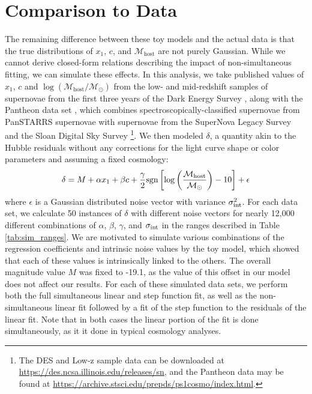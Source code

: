 \section{Comparison to Data}
\label{sec:data_comparison}
The remaining difference between these toy models and the actual data is that the true distributions of $x_1$, $c$, and $\mathcal{M}_\text{host}$ are not purely Gaussian. While we cannot derive closed-form relations describing the impact of non-simultaneous fitting, we can simulate these effects. In this analysis, we take published values of $x_1$, $c$ and $\log(\mathcal{M}_\text{host}/\mathcal{M}_\odot)$ from the low- and mid-redshift samples of supernovae from the first three years of the Dark Energy Survey \cite[][hereafter referred to as the Low-z and DES subsamples]{abbott_first_2019}, along with the Pantheon data set \citep{scolnic_complete_2018}, which combines spectroscopically-classified supernovae from PanSTARRS supernovae \cite[PS1;][]{rest_cosmological_2014, scolnic_color_2014} with supernovae from the SuperNova Legacy Survey \cite[SNLS;][]{conley_supernova_2011, sullivan_snls3_2011} and the Sloan Digital Sky Survey \cite[SDSS;][]{frieman_sloan_2008, kessler_first-year_2009, sako_data_2018}\footnote{The DES and Low-z sample data can be downloaded at \url{https://des.ncsa.illinois.edu/releases/sn}, and the Pantheon data may be found at \url{https://archive.stsci.edu/prepds/ps1cosmo/index.html}.}. We then modeled $\delta$, a quantity akin to the Hubble residuals without any corrections for the light curve shape or color parameters and assuming a fixed cosmology:
\begin{equation}
    \delta= M + \alpha x_1 + \beta c + \frac{\gamma}{2}\text{sgn}\left[\log\left(\frac{\mathcal{M}_\text{host}}{\mathcal{M}_\odot}\right) - 10 \right] + \epsilon
\end{equation}
where $\epsilon$ is a Gaussian distributed noise vector with variance $\sigma_{\text{int}}^2$. For each data set, we calculate 50 instances of $\delta$ with different noise vectors for nearly 12,000 different combinations of $\alpha$, $\beta$, $\gamma$, and $\sigma_{\text{int}}$ in the ranges described in Table \ref{tab:sim_ranges}. We are motivated to simulate various combinations of the regression coefficients and intrinsic noise values by the toy model, which showed that each of these values is intrinsically linked to the others. The overall magnitude value $M$ was fixed to -19.1, as the value of this offset in our model does not affect our results. For each of these simulated data sets, we perform both the full simultaneous linear and step function fit, as well as the non-simultaneous linear fit followed by a fit of the step function to the residuals of the linear fit. Note that in both cases the linear portion of the fit is done simultaneously, as it it done in typical cosmology analyses.

